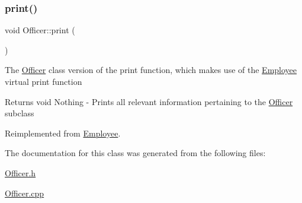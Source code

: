 \subsubsection{\texorpdfstring{print()}{print()}}
{\footnotesize\ttfamily void Officer\+::print (\begin{DoxyParamCaption}{ }\end{DoxyParamCaption})\hspace{0.3cm}{\ttfamily [virtual]}}

The \hyperlink{classOfficer}{Officer} class version of the print function, which makes use of the \hyperlink{classEmployee}{Employee} virtual print function

\begin{DoxyReturn}{Returns}
void Nothing -\/ Prints all relevant information pertaining to the \hyperlink{classOfficer}{Officer} subclass 
\end{DoxyReturn}


Reimplemented from \hyperlink{classEmployee_a79556ad700627dba88049f487a34a762}{Employee}.



The documentation for this class was generated from the following files\+:\begin{DoxyCompactItemize}
\item 
\hyperlink{Officer_8h}{Officer.\+h}\item 
\hyperlink{Officer_8cpp}{Officer.\+cpp}\end{DoxyCompactItemize}
